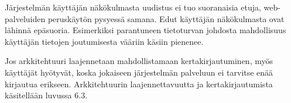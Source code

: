 Järjestelmän käyttäjän näkökulmasta uudistus ei tuo suoranaisia etuja, web-pal\-ve\-lui\-den peruskäytön pysyessä samana. Edut käyttäjän näkökulmasta ovat lähinnä epäsuoria. Esimerkiksi parantuneen tietoturvan johdosta mahdollisuus käyttäjän tietojen joutumisesta vääriin käsiin pienenee.

Jos arkkitehtuuri laajennetaan mahdollistamaan kertakirjautuminen, myös käyttäjät hyötyvät, koska jokaiseen järjestelmän palveluun ei tarvitse enää kirjautua erikseen. Arkkitehtuurin laajennettavuutta ja kertakirjautumista käsitellään luvussa 6.3.